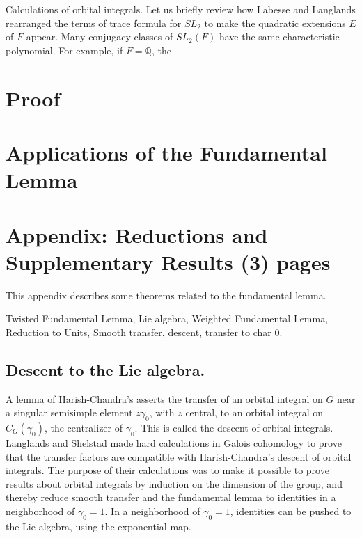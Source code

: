 \documentclass[brochure,english,12pt]{bourbaki}
\newcommand{\ring}[1]{\mathbb{#1}}
\begin{document}
Calculations of orbital integrals.  Let us briefly review how Labesse
and Langlands rearranged the terms of trace formula for $SL_2$ to make
the quadratic extensions $E$ of $F$ appear.  Many conjugacy classes of
$SL_2(F)$ have the same characteristic polynomial.  For example, if
$F=\ring{Q}$, the

\section{Proof} %



\section{Applications of the Fundamental Lemma}  




\section{Appendix: Reductions and Supplementary Results (3) pages}



This appendix describes some theorems related to the fundamental lemma.

Twisted Fundamental Lemma, Lie algebra, Weighted Fundamental Lemma,
Reduction to Units, Smooth transfer, descent, transfer to char 0.

\subsection{Descent to the Lie algebra.}

A lemma of Harish-Chandra's asserts the transfer of an orbital
integral on $G$ near a singular semisimple element $z\gamma_0$, with
$z$ central, to an orbital integral on $C_G(\gamma_0)$, the
centralizer of $\gamma_0$.  This is called the descent of orbital
integrals.  Langlands and Shelstad made hard calculations in
Galois cohomology to prove that the transfer factors are compatible
with Harish-Chandra's descent of orbital integrals.  The purpose of
their calculations was to make it possible to prove results about
orbital integrals by induction on the dimension of the group, and
thereby reduce smooth transfer and the fundamental lemma to identities
in a neighborhood of $\gamma_0=1$.  In a neighborhood of $\gamma_0=1$,
identities can be pushed to the Lie algebra, using the exponential map.
\end{document}
